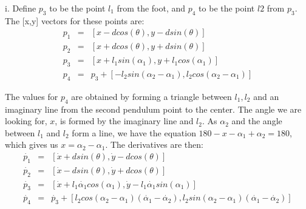 \documentclass[11pt]{article}
\begin{document}
i. Define $p_3$ to be the point $l_1$ from the foot, and $p_4$ to be the point $l2$ from $p_3$. The [x,y] vectors for these points are:
\begin{eqnarray*}
	p_1 &=& [x-dcos(\theta),y-dsin(\theta)]\\
	p_2 &=& [x+dcos(\theta),y+dsin(\theta)]\\
	p_3 &=& [x+l_1sin(\alpha_1), y+l_1cos(\alpha_1)]\\
	p_4 &=& p_3 + [-l_2sin(\alpha_2-\alpha_1), l_2cos(\alpha_2-\alpha_1)]
\end{eqnarray*}

The values for $p_4$ are obtained by forming a triangle between $l_1,l_2$ and an imaginary line from the second pendulum point to the center. The angle we are looking for, $x$, is formed by the imaginary line and $l_2$. As $\alpha_2$ and the angle between $l_1$ and $l_2$ form a line, we have the equation $180-x-\alpha_1+\alpha_2 = 180$, which gives us $x=\alpha_2-\alpha_1$. The derivatives are then:
\begin{eqnarray*}
	\dot{p_1} &=& [\dot{x}+dsin(\theta),\dot{y}-dcos(\theta)]\\
	\dot{p_2} &=& [\dot{x}-dsin(\theta),\dot{y}+dcos(\theta)]\\
	\dot{p_3} &=& [\dot{x} + l_1\dot{\alpha_1}cos(\alpha_1), \dot{y}-l_1\dot{\alpha_1}sin(\alpha_1)]\\
	\dot{p_4} &=& \dot{p_3} + [l_2cos(\alpha_2-\alpha_1)(\dot{\alpha_1} - \dot{\alpha_2}), l_2sin(\alpha_2-\alpha_1)(\dot{\alpha_1}-\dot{\alpha_2})]
\end{eqnarray*}
\end{document}
